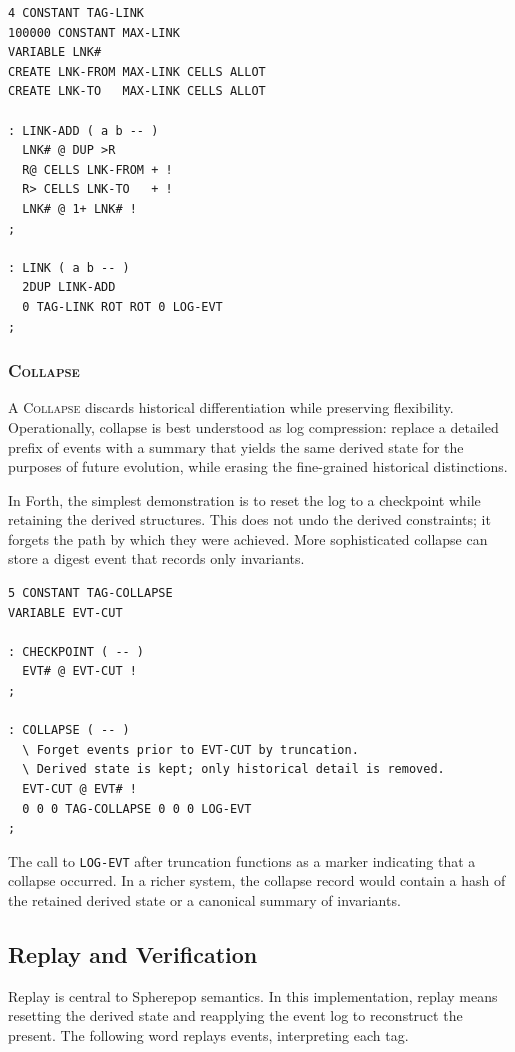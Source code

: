 \documentclass[11pt]{article}
\begin{document}
\begin{verbatim}
4 CONSTANT TAG-LINK
100000 CONSTANT MAX-LINK
VARIABLE LNK#
CREATE LNK-FROM MAX-LINK CELLS ALLOT
CREATE LNK-TO   MAX-LINK CELLS ALLOT

: LINK-ADD ( a b -- )
  LNK# @ DUP >R
  R@ CELLS LNK-FROM + !
  R> CELLS LNK-TO   + !
  LNK# @ 1+ LNK# !
;

: LINK ( a b -- )
  2DUP LINK-ADD
  0 TAG-LINK ROT ROT 0 LOG-EVT
;
\end{verbatim}

\subsubsection{\textsc{Collapse}}

A \textsc{Collapse} discards historical differentiation while preserving
flexibility. Operationally, collapse is best understood as log compression:
replace a detailed prefix of events with a summary that yields the same derived
state for the purposes of future evolution, while erasing the fine-grained
historical distinctions.

In Forth, the simplest demonstration is to reset the log to a checkpoint while
retaining the derived structures. This does not undo the derived constraints; it
forgets the path by which they were achieved. More sophisticated collapse can
store a digest event that records only invariants.

\begin{verbatim}
5 CONSTANT TAG-COLLAPSE
VARIABLE EVT-CUT

: CHECKPOINT ( -- )
  EVT# @ EVT-CUT !
;

: COLLAPSE ( -- )
  \ Forget events prior to EVT-CUT by truncation.
  \ Derived state is kept; only historical detail is removed.
  EVT-CUT @ EVT# !
  0 0 0 TAG-COLLAPSE 0 0 0 LOG-EVT
;
\end{verbatim}

The call to \texttt{LOG-EVT} after truncation functions as a marker indicating
that a collapse occurred. In a richer system, the collapse record would contain
a hash of the retained derived state or a canonical summary of invariants.

\subsection{Replay and Verification}

Replay is central to Spherepop semantics. In this implementation, replay means
resetting the derived state and reapplying the event log to reconstruct the
present. The following word replays events, interpreting each tag.
\end{document}
